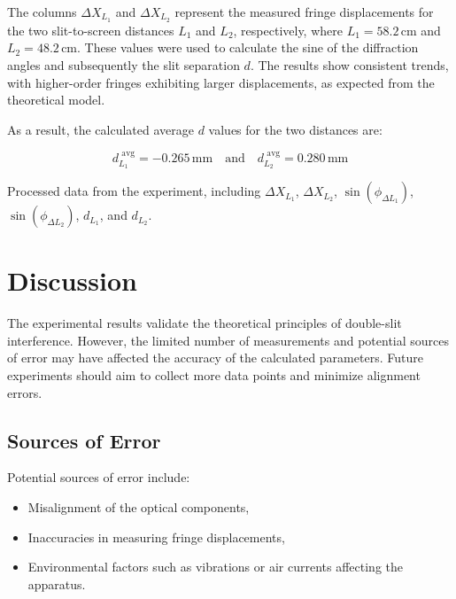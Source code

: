 \documentclass[journal]{IEEEtran}
\begin{document}
The columns $\Delta X_{L_1}$ and $\Delta X_{L_2}$ represent the measured fringe displacements for the two slit-to-screen distances $L_1$ and $L_2$, respectively, where $L_1 = 58.2 \, \text{cm}$ and $L_2 = 48.2 \, \text{cm}$. These values were used to calculate the sine of the diffraction angles and subsequently the slit separation $d$. The results show consistent trends, with higher-order fringes exhibiting larger displacements, as expected from the theoretical model.

As a result, the calculated average $d$ values for the two distances are:

\begin{equation}
    d_{L_1}^{\text{ avg}} = -0.265 \, \text{mm} \quad \text{and} \quad d_{L_2 }^{\text{ avg}} = 0.280 \, \text{mm}
    \end{equation}
 
    \begin{table*}[t]
        \centering 
        \caption{Processed data from the experiment, including $\Delta X_{L_1}$, $\Delta X_{L_2}$, $\sin(\phi_{\Delta L_1})$, $\sin(\phi_{\Delta L_2})$, $d_{L_1}$, and $d_{L_2}$.}
        \label{fig:processed_data_visualization}
    \end{table*}


\section{Discussion}
The experimental results validate the theoretical principles of double-slit interference. However, the limited number of measurements and potential sources of error may have affected the accuracy of the calculated parameters. Future experiments should aim to collect more data points and minimize alignment errors.

\subsection{Sources of Error}
Potential sources of error include:
\begin{itemize}
    \item Misalignment of the optical components,
    \item Inaccuracies in measuring fringe displacements,
    \item Environmental factors such as vibrations or air currents affecting the apparatus.
\end{itemize}
\end{document}
